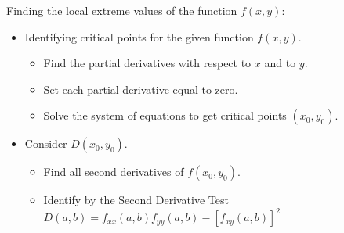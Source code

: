 Finding the local extreme values of the function $f(x,y)$:
\begin{itemize}
  \item Identifying critical points for the given function $f(x,y)$.
    \begin{itemize}
      \item Find the partial derivatives with respect to $x$ and to $y$.
      \item Set each partial derivative equal to zero.
      \item Solve the system of equations to get critical points $(x_0,y_0)$.
    \end{itemize}

  \item Consider $D(x_0,y_0)$.
    \begin{itemize}
      \item Find all second derivatives of $f(x_0,y_0)$.
      \item Identify by the Second Derivative Test $ D(a,b) = f_{xx}(a,b) f_{yy}(a,b) - [f_{xy}(a,b)]^2 $
    \end{itemize}
\end{itemize}

\vspace*{1cm}

